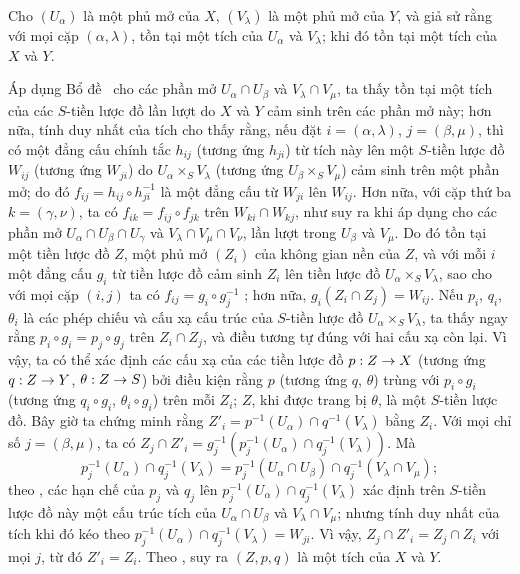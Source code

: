 \documentclass[oneside]{amsart}
\makeatletter
\newcommand{\ega@arrow}[2]{\mathchoice{#1}{#2}{#2}{#2}}
\renewcommand{\to}{\ega@arrow{\longrightarrow}{\rightarrow}}
\newcommand{\oldpage}[2][]{{\marginnote{\normalfont\textbf{#1}~|~#2}}\ignorespaces}
\let\EGAOriginalLabel\label
\renewcommand{\label}[1]{\phantomsection\EGAOriginalLabel{#1}}
\makeatother
\begin{document}
\oldpage[I]{107}
\begin{lemma}[3.2.6.3]
\label{I.3.2.6.3}
Cho $(U_\alpha)$ là một phủ mở của $X$, $(V_\lambda)$ là một phủ mở của
$Y$, và giả sử rằng với mọi cặp $(\alpha,\lambda)$, tồn tại một tích của
$U_\alpha$ và $V_\lambda$; khi đó tồn tại một tích của $X$ và $Y$.
\end{lemma}

Áp dụng Bổ đề~ cho các phần mở
$U_\alpha\cap U_\beta$ và $V_\lambda\cap V_\mu$, ta thấy tồn tại một tích
của các $S$-tiền lược đồ lần lượt do $X$ và $Y$ cảm sinh trên các phần mở
này; hơn nữa, tính duy nhất của tích cho thấy rằng, nếu đặt
$i=(\alpha,\lambda)$, $j=(\beta,\mu)$, thì có một đẳng cấu chính tắc
$h_{ij}$ (tương ứng $h_{ji}$) từ tích này lên một $S$-tiền lược đồ $W_{ij}$
(tương ứng $W_{ji}$) do $U_\alpha\times_S V_\lambda$
(tương ứng $U_\beta\times_S V_\mu$) cảm sinh trên một phần mở; do đó
$f_{ij}=h_{ij}\circ h_{ji}^{-1}$ là một đẳng cấu từ $W_{ji}$ lên $W_{ij}$.
Hơn nữa, với cặp thứ ba $k=(\gamma,\nu)$, ta có
$f_{ik}=f_{ij}\circ f_{jk}$ trên $W_{ki}\cap W_{kj}$, như suy ra khi áp
dụng  cho các phần mở
$U_\alpha\cap U_\beta\cap U_\gamma$ và
$V_\lambda\cap V_\mu\cap V_\nu$, lần lượt trong $U_\beta$ và $V_\mu$.
Do đó tồn tại một tiền lược đồ $Z$, một phủ mở $(Z_i)$ của không gian nền
của $Z$, và với mỗi $i$ một đẳng cấu $g_i$ từ tiền lược đồ cảm sinh $Z_i$
lên tiền lược đồ $U_\alpha\times_S V_\lambda$, sao cho với mọi cặp $(i,j)$
ta có $f_{ij}=g_i\circ g_j^{-1}$ ; hơn nữa,
$g_i(Z_i\cap Z_j)=W_{ij}$. Nếu $p_i$, $q_i$, $\theta_i$ là các phép chiếu và
cấu xạ cấu trúc của $S$-tiền lược đồ $U_\alpha\times_S V_\lambda$, ta thấy
ngay rằng $p_i\circ g_i=p_j\circ g_j$ trên $Z_i\cap Z_j$, và điều tương tự
đúng với hai cấu xạ còn lại. Vì vậy, ta có thể xác định các cấu xạ của các
tiền lược đồ $p:Z\to X$ (tương ứng $q:Z\to Y$, $\theta:Z\to S$) bởi điều
kiện rằng $p$ (tương ứng $q$, $\theta$) trùng với $p_i\circ g_i$
(tương ứng $q_i\circ g_i$, $\theta_i\circ g_i$) trên mỗi $Z_i$; $Z$, khi
được trang bị $\theta$, là một $S$-tiền lược đồ. Bây giờ ta chứng minh rằng
$Z'_i=p^{-1}(U_\alpha)\cap q^{-1}(V_\lambda)$ bằng $Z_i$. Với mọi chỉ số
$j=(\beta,\mu)$, ta có
$Z_j\cap Z'_i=g_j^{-1}(p_j^{-1}(U_\alpha)\cap q_j^{-1}(V_\lambda))$. Mà
\[
  p_j^{-1}(U_\alpha)\cap q_j^{-1}(V_\lambda)
  =p_j^{-1}(U_\alpha\cap U_\beta)\cap
   q_j^{-1}(V_\lambda\cap V_\mu);
\]
theo , các hạn chế của $p_j$ và $q_j$ lên
$p_j^{-1}(U_\alpha)\cap q_j^{-1}(V_\lambda)$ xác định trên
$S$-tiền lược đồ này một cấu trúc tích của $U_\alpha\cap U_\beta$ và
$V_\lambda\cap V_\mu$; nhưng tính duy nhất của tích khi đó kéo theo
$p_j^{-1}(U_\alpha)\cap q_j^{-1}(V_\lambda)=W_{ji}$. Vì vậy,
$Z_j\cap Z'_i=Z_j\cap Z_i$ với mọi $j$, từ đó $Z'_i=Z_i$. Theo
, suy ra $(Z,p,q)$ là một tích của $X$ và $Y$.
\end{document}
